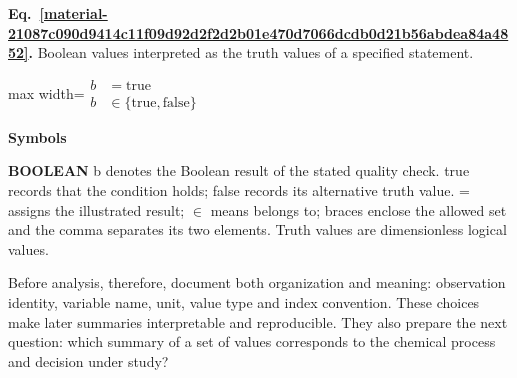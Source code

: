 \documentclass[11pt,a4paper]{article}
\begin{document}
\par\medskip
\noindent\begin{minipage}{\linewidth}
\label{material-21087c090d9414c11f09d92d2f2d2b01e470d7066dcdb0d21b56abdea84a4852}
\noindent\textbf{Eq.~\ref*{material-21087c090d9414c11f09d92d2f2d2b01e470d7066dcdb0d21b56abdea84a4852}.} Boolean values interpreted as the truth values of a specified statement.\par\nopagebreak
\begin{center}\begin{adjustbox}{max width=\linewidth}$\displaystyle \begin{aligned}b&=\mathrm{true}\\b&\in\{\mathrm{true},\mathrm{false}\}\end{aligned}$\end{adjustbox}\end{center}

\par\noindent\textbf{Symbols}

\par\noindent\textbf{BOOLEAN} b denotes the Boolean result of the stated quality check. true records that the condition holds; false records its alternative truth value. = assigns the illustrated result; \ensuremath{\in} means belongs to; braces enclose the allowed set and the comma separates its two elements. Truth values are dimensionless logical values.

\end{minipage}\par
\medskip

Before analysis, therefore, document both organization and meaning: observation identity, variable name, unit, value type and index convention. These choices make later summaries interpretable and reproducible. They also prepare the next question: which summary of a set of values corresponds to the chemical process and decision under study?
\end{document}
